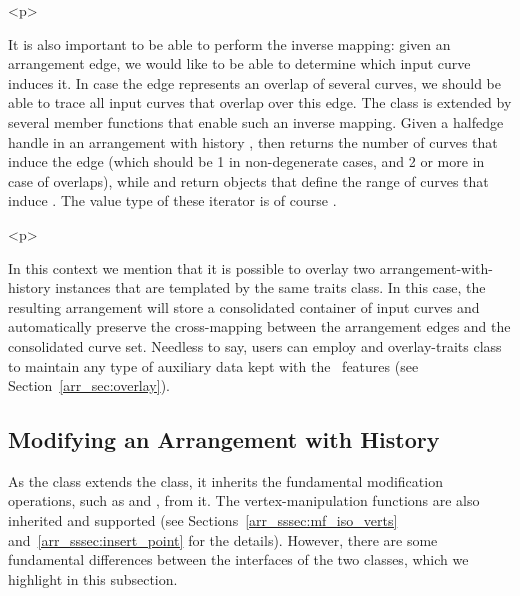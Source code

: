 \begin{ccHtmlOnly}<p>\end{ccHtmlOnly}
It is also important to be able to perform the inverse mapping: given an
arrangement edge, we would like to be able to determine which input curve
induces it. In case the edge represents an overlap of several curves, we
should be able to trace all input curves that overlap over this edge.
The  class is extended by several member
functions that enable such an inverse mapping. Given a halfedge handle 
in an arrangement with history , then 
 returns the number of curves that
induce the edge (which should be 1 in non-degenerate cases, and 2 or more
in case of overlaps), while  and 
 return 
 objects that
define the range of curves that induce . The value type of these
iterator is of course .

\begin{ccHtmlOnly}<p>\end{ccHtmlOnly}
In this context we mention that it is possible to overlay two 
arrangement-with-history instances that are templated by the same traits
class. In this case, the resulting arrangement will store a consolidated
container of input curves and automatically preserve the cross-mapping
between the arrangement edges and the consolidated curve set. Needless to
say, users can employ and overlay-traits class to maintain any type of
auxiliary data kept with the \dcel\ features (see 
Section~\ref{arr_sec:overlay}).

\subsection{Modifying an Arrangement with History}
\label{arr_ssec:modif_traverse}
%
As the  class extends the 
class, it inherits the fundamental modification operations, such as 
 and , from it. The vertex-manipulation functions
are also inherited and supported (see Sections~\ref{arr_sssec:mf_iso_verts}
and~\ref{arr_sssec:insert_point} for the details). However, there are some 
fundamental differences between the interfaces of the two classes, which we
highlight in this subsection.

